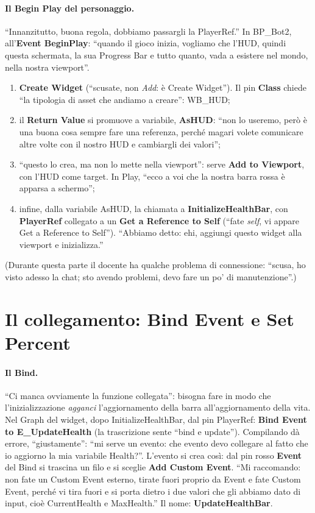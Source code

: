 \paragraph{Il Begin Play del personaggio.} ``Innanzitutto, buona regola, dobbiamo passargli
la PlayerRef.'' In BP\_Bot2, all'\textbf{Event BeginPlay}: ``quando il gioco inizia,
vogliamo che l'HUD, quindi questa schermata, la sua Progress Bar e tutto quanto, vada a
esistere nel mondo, nella nostra viewport''.
\begin{enumerate}
  \item \textbf{Create Widget} (``scusate, non \emph{Add}: è Create Widget''). Il pin
        \textbf{Class} chiede ``la tipologia di asset che andiamo a creare'': WB\_HUD;
  \item il \textbf{Return Value} si promuove a variabile, \textbf{AsHUD}: ``non lo useremo,
        però è una buona cosa sempre fare una referenza, perché magari volete comunicare
        altre volte con il nostro HUD e cambiargli dei valori'';
  \item ``questo lo crea, ma non lo mette nella viewport'': serve \textbf{Add to Viewport},
        con l'HUD come target. In Play, ``ecco a voi che la nostra barra rossa è apparsa
        a schermo'';
  \item infine, dalla variabile AsHUD, la chiamata a \textbf{InitializeHealthBar}, con
        \textbf{PlayerRef} collegato a un \textbf{Get a Reference to Self} (``fate
        \emph{self}, vi appare Get a Reference to Self''). ``Abbiamo detto: ehi, aggiungi
        questo widget alla viewport e inizializza.''
\end{enumerate}
(Durante questa parte il docente ha qualche problema di connessione: ``scusa, ho visto
adesso la chat; sto avendo problemi, devo fare un po' di manutenzione''.)

\section{Il collegamento: Bind Event e Set Percent}
\label{ue11:sec:bind}

\paragraph{Il Bind.} ``Ci manca ovviamente la funzione collegata'': bisogna fare in modo
che l'inizializzazione \emph{agganci} l'aggiornamento della barra all'aggiornamento della
vita. Nel Graph del widget, dopo InitializeHealthBar, dal pin PlayerRef: \textbf{Bind
Event to E\_UpdateHealth} (la trascrizione sente ``bind e update''). Compilando dà errore,
``giustamente'': ``mi serve un evento: che evento devo collegare al fatto che io aggiorno la
mia variabile Health?''. L'evento si crea così: dal pin rosso \textbf{Event} del Bind si
trascina un filo e si sceglie \textbf{Add Custom Event}. ``Mi raccomando: non fate un
Custom Event esterno, tirate fuori proprio da Event e fate Custom Event, perché vi tira
fuori e si porta dietro i due valori che gli abbiamo dato di input, cioè CurrentHealth e
MaxHealth.'' Il nome: \textbf{UpdateHealthBar}.

